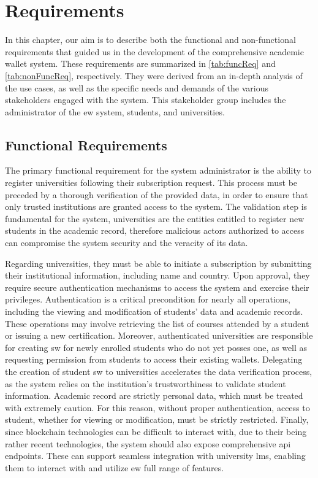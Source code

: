\chapter{Requirements}
\label{chap:requirements}
In this chapter, our aim is to describe both the functional and non-functional requirements that guided us in the development of the comprehensive academic wallet system. These requirements are summarized in \cref{tab:funcReq} and \cref{tab:nonFuncReq}, respectively. They were derived from an in-depth analysis of the use cases, as well as the specific needs and demands of the various stakeholders engaged with the system. This stakeholder group includes the administrator of the \acrfull{ew} system, students, and universities.

\section{Functional Requirements}
The primary functional requirement for the system administrator is the ability to register universities following their subscription request. This process must be preceded by a thorough verification of the provided data, in order to ensure that only trusted institutions are granted access to the system. The validation step is fundamental for the system, universities are the entities entitled to register new students in the academic record, therefore malicious actors authorized to access can compromise the system security and the veracity of its data.

Regarding universities, they must be able to initiate a subscription by submitting their institutional information, including name and country. Upon approval, they require secure authentication mechanisms to access the system and exercise their privileges. Authentication is a critical precondition for nearly all operations, including the viewing and modification of students' data and academic records. These operations may involve retrieving the list of courses attended by a student or issuing a new certification. Moreover, authenticated universities are responsible for creating \acrfull{sw} for newly enrolled students who do not yet posses one, as well as requesting permission from students to access their existing wallets. Delegating the creation of student \acrshort{sw} to universities accelerates the data verification process, as the system relies on the institution's trustworthiness to validate student information. Academic record are strictly personal data, which must be treated with extremely caution. For this reason, without proper authentication, access to student, whether for viewing or modification, must be strictly restricted. Finally, since blockchain technologies can be difficult to interact with, due to their being rather recent technologies, the system should also expose comprehensive \acrfull{api} endpoints. These can support seamless integration with university \acrfull{lms}, enabling them to interact with and utilize \acrlong{ew} full range of features.

